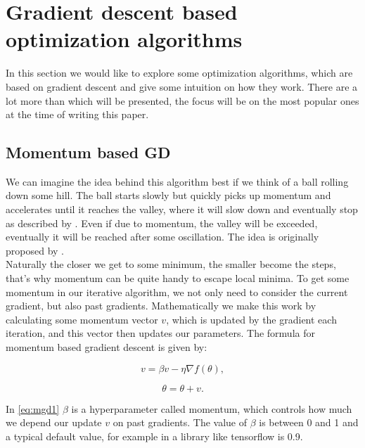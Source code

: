 \documentclass[aodsor,preprint]{imsart}
\numberwithin{equation}{section}
\theoremstyle{plain}
\begin{document}
\section{Gradient descent based optimization algorithms}
In this section we would like to explore some optimization algorithms, which are based on gradient descent and give some intuition on how they work. There are a lot more than which will be presented, the focus will be on the most popular ones at the time of writing this paper.

\subsection{Momentum based GD}
We can imagine the idea behind this algorithm best if we think of a ball rolling down some hill. The ball starts slowly but quickly picks up momentum and accelerates until it reaches the valley, where it will slow down and eventually stop as described by \cite{geron2019hands}. Even if due to momentum, the valley will be exceeded, eventually it will be reached after some oscillation. The idea is originally proposed by \cite{polyak}.\\
Naturally the closer we get to some minimum, the smaller become the steps, that's why momentum can be quite handy to escape local minima. To get some momentum in our iterative algorithm, we not only need to consider the current gradient, but also past gradients. Mathematically we make this work by calculating some momentum vector $v$, which is updated by the gradient each iteration, and this vector then updates our parameters. The formula for momentum based gradient descent is given by:

\begin{equation} \label{eq:mgd1}
v = \beta v - \eta \nabla f(\theta),
\end{equation}

\begin{equation} \label{eq:mgd2}
\theta = \theta + v.
\end{equation}

In \ref{eq:mgd1} $\beta$ is a hyperparameter called momentum, which controls how much we depend our update $v$ on past gradients. The value of $\beta$ is between 0 and 1 and a typical default value, for example in a library like tensorflow is 0.9.
\end{document}
